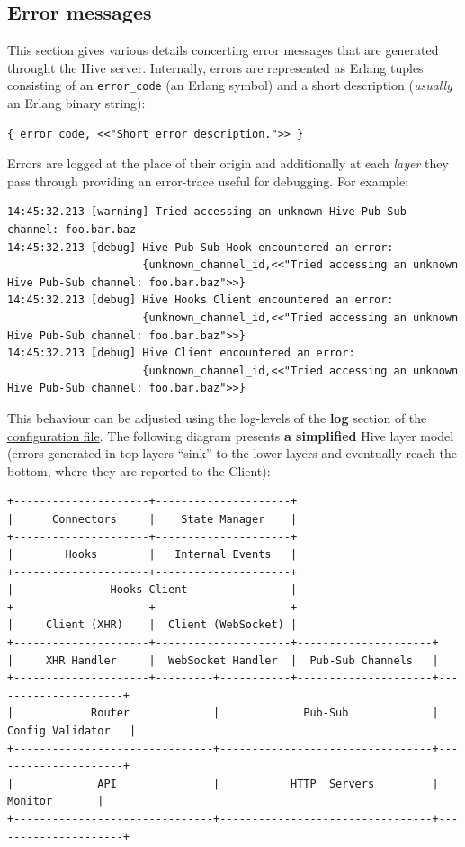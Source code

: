 \documentclass[a4paper]{article}
\begin{document}
\subsection{Error messages}
\label{sec-5-2}

This section gives various details concerting error messages that are generated throught the Hive server. Internally, errors are represented as Erlang tuples consisting of an \texttt{error\_code} (an Erlang symbol) and a short description (\emph{usually} an Erlang binary string):


\begin{verbatim}
{ error_code, <<"Short error description.">> }
\end{verbatim}




\noindent
Errors are logged at the place of their origin and additionally at each \emph{layer} they pass through providing an error-trace useful for debugging. For example:


\begin{verbatim}
14:45:32.213 [warning] Tried accessing an unknown Hive Pub-Sub channel: foo.bar.baz
14:45:32.213 [debug] Hive Pub-Sub Hook encountered an error:
                     {unknown_channel_id,<<"Tried accessing an unknown Hive Pub-Sub channel: foo.bar.baz">>}
14:45:32.213 [debug] Hive Hooks Client encountered an error:
                     {unknown_channel_id,<<"Tried accessing an unknown Hive Pub-Sub channel: foo.bar.baz">>}
14:45:32.213 [debug] Hive Client encountered an error:
                     {unknown_channel_id,<<"Tried accessing an unknown Hive Pub-Sub channel: foo.bar.baz">>}
\end{verbatim}



\noindent
This behaviour can be adjusted using the log-levels of the \textbf{log} section of the \hyperref[sec-3-1-8]{configuration file}. The following diagram presents \textbf{a simplified} Hive layer model (errors generated in top layers ``sink'' to the lower layers and eventually reach the bottom, where they are reported to the Client):


\begin{verbatim}
+---------------------+---------------------+
|      Connectors     |    State Manager    |
+---------------------+---------------------+
|        Hooks        |   Internal Events   |
+---------------------+---------------------+
|               Hooks Client                |
+---------------------+---------------------+
|     Client (XHR)    |  Client (WebSocket) |
+---------------------+---------------------+---------------------+
|     XHR Handler     |  WebSocket Handler  |  Pub-Sub Channels   |
+---------------------+---------+-----------+---------------------+---------------------+
|            Router             |             Pub-Sub             |  Config Validator   |
+-------------------------------+---------------------------------+---------------------+
|             API               |           HTTP  Servers         |       Monitor       |
+-------------------------------+---------------------------------+---------------------+
\end{verbatim}
\end{document}
